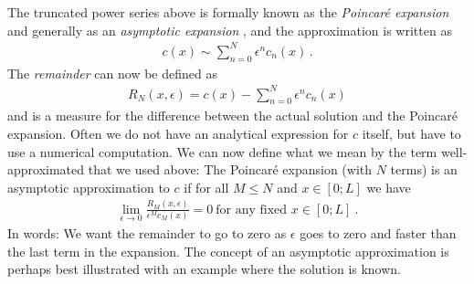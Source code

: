 The truncated power series above is formally known as the \emph{Poincar\'{e} expansion}
 and
generally as an \emph{asymptotic expansion} , and the approximation is written as
\begin{eqnarray}
	c(x) \sim \sum_{n=0}^N \epsilon^n c_n(x)  \, .
\end{eqnarray}
The \emph{remainder} can now be defined as 
\begin{eqnarray}
	R_N(x,\epsilon) = c(x) - \sum_{n=0}^N \epsilon^n c_n(x)  
\end{eqnarray}
and is a measure for the difference between the actual solution and the Poincar\'{e} expansion. Often 
we do not have an analytical expression for $c$ itself, but have to use a numerical computation. 
We can now define what we mean by the term well-approximated that we used 
above: The Poincar\'{e} expansion (with $N$ terms) is an asymptotic approximation to $c$ if for
all $M\leq N$ and $x \in [0; L]$ we have
\begin{eqnarray}
	\lim_{\epsilon \rightarrow 0}	\frac{R_M(x, \epsilon)}{\epsilon^M c_M(x)} = 0  \ 
	\text{for any fixed $x \in [0;L]$} \ .
	\label{eq:asymappr}
\end{eqnarray}
In words: We want the remainder to go to zero as $\epsilon$ goes to zero and faster than the last
term in the expansion. The concept of an asymptotic approximation is perhaps best illustrated  
with an example where the solution is known. 
